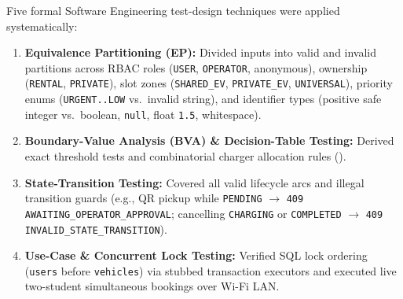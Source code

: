 \label{subsec:test-techniques}
Five formal Software Engineering test-design techniques were applied systematically:
\begin{enumerate}
  \item \textbf{Equivalence Partitioning (EP):} Divided inputs into valid and invalid partitions across RBAC roles (\texttt{USER}, \texttt{OPERATOR}, anonymous), ownership (\texttt{RENTAL}, \texttt{PRIVATE}), slot zones (\texttt{SHARED\_\allowbreak EV}, \texttt{PRIVATE\_\allowbreak EV}, \texttt{UNIVERSAL}), priority enums (\texttt{URGENT..LOW} vs.\ invalid string), and identifier types (positive safe integer vs.\ boolean, \texttt{null}, float \texttt{1.5}, whitespace).
  \item \textbf{Boundary-Value Analysis (BVA) \& Decision-Table Testing:} Derived exact threshold tests and combinatorial charger allocation rules ().
  \item \textbf{State-Transition Testing:} Covered all valid lifecycle arcs and illegal transition guards (e.g., QR pickup while \texttt{PENDING} $\rightarrow$ \texttt{409 AWAITING\_\allowbreak OPERATOR\_\allowbreak APPROVAL}; cancelling \texttt{CHARGING} or \texttt{COMPLETED} $\rightarrow$ \texttt{409 INVALID\_\allowbreak STATE\_\allowbreak TRANSITION}).
  \item \textbf{Use-Case \& Concurrent Lock Testing:} Verified SQL lock ordering (\texttt{users} before \texttt{vehicles}) via stubbed transaction executors and executed live two-student simultaneous bookings over Wi-Fi LAN.
\end{enumerate}


